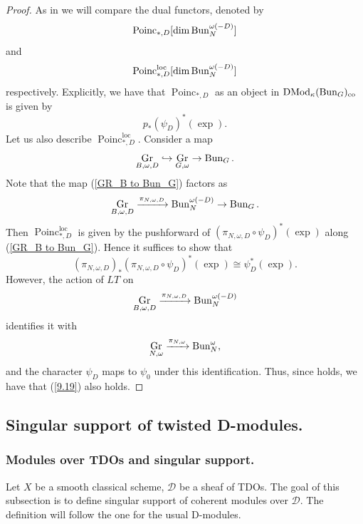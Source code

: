 \documentclass[9pt]{amsart}
\DeclareMathOperator{\Gra}{{Gr}}
\newcommand{\cD}{{\mathcal D}}
\numberwithin{equation}{section}
\DeclareMathOperator{\D}{{DMod}}
\begin{document}
	\begin{proof}
		As in \cite[Lemma 9.6.7]{GLCII} we will compare the dual functors, denoted by $$\operatorname{Poinc}_{*, D}[\dim \operatorname{{Bun}}_N^{\omega(-D)}]$$ and $$\operatorname{Poinc}_{*, D}^{\operatorname{loc}}[\dim \operatorname{{Bun}}_N^{\omega(-D)}]$$ respectively. Explicitly, we have that $\operatorname{Poinc}_{*, D}$ as an object in $\D_{\kappa}(\Bun_G)_{\operatorname{co}}$ is given by 
		$$p_*(\psi_D)^*(\exp).$$
		Let us also describe $\operatorname{Poinc}_{*, D}^{\operatorname{loc}}$. Consider a map
		\begin{equation}\label{GR_B to Bun_G}
		\Gra_{B, \omega, D} \hookrightarrow \Gra_{G, \omega} \rightarrow \Bun_G.
		\end{equation}
		Note that the map (\ref{GR_B to Bun_G}) factors as $$\Gra_{B, \omega, D} \xrightarrow{\pi_{N, \omega, D}}\Bun_N^{\omega(-D)} \rightarrow \Bun_G.$$
		Then $\operatorname{Poinc}_{*, D}^{\operatorname{loc}}$ is given by the pushforward of $(\pi_{N, \omega, D} \circ \psi_D)^*(\exp)$ along (\ref{GR_B to Bun_G}). Hence it suffices to show that 
		\begin{equation}\label{9.19}
		(\pi_{N, \omega, D})_*(\pi_{N, \omega, D} \circ \psi_D)^*(\exp) \cong \psi_D^*(\exp).
		\end{equation}
		However, the action of $LT$ on $$\Gra_{B, \omega, D} \xrightarrow{\pi_{N, \omega, D}}\Bun_N^{\omega(-D)} $$
		identifies it with 
		$$\Gra_{N, \omega} \xrightarrow{\pi_{N, \omega}}\Bun_N^{\omega},$$
		and the character $\psi_D$ maps to $\psi_0$ under this identification. Thus, since \cite[(9.19)]{GLCII} holds, we have that (\ref{9.19}) also holds.
	\end{proof}

	
	
	\subsection{Singular support of twisted D-modules.}
	
	\subsubsection{Modules over TDOs and singular support.} Let $X$ be a smooth classical scheme, $\cD$ be a sheaf of TDOs. The goal of this subsection is to define singular support of coherent modules over $\cD$. The definition will follow the one for the usual D-modules. 
	
\end{document}

